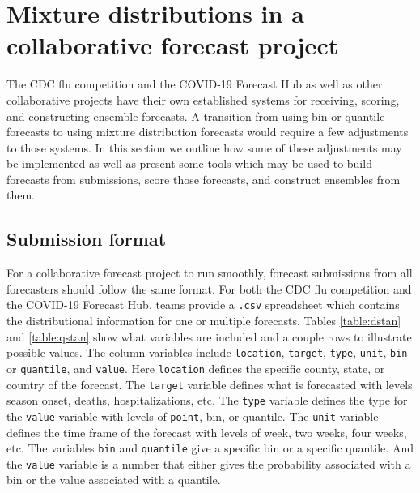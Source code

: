 \documentclass[11pt,notitlepage]{isuthesis}
\begin{document}
\begin{flushleft}
\end{flushleft}



























\chapter{Mixture distributions in a collaborative forecast project}
\label{section:conmixforc}


The CDC flu competition and the COVID-19 Forecast Hub as well as other 
collaborative projects
have their own established systems for receiving, 
scoring, and constructing ensemble forecasts. A transition from using bin or 
quantile forecasts to using mixture distribution forecasts
would require
a few adjustments to those systems. In this section we outline how some of these
adjustments may be implemented as well as present some tools which may be used
to build forecasts from submissions, score those forecasts, and construct 
ensembles from them.

\section{Submission format}
For a collaborative forecast project to run smoothly, forecast submissions from 
all forecasters 
should follow the same format. For both the CDC flu competition and
the COVID-19 Forecast Hub, teams provide a \texttt{.csv} spreadsheet which 
contains the distributional information for one or multiple forecasts. Tables
\ref{table:dstan} and \ref{table:qstan} show what variables are included and a
couple rows to illustrate possible values.
The column variables include \texttt{location}, \texttt{target}, \texttt{type},
\texttt{unit}, \texttt{bin} or \texttt{quantile}, and \texttt{value}.
Here \texttt{location} defines the specific county, state, or country of the 
forecast. The \texttt{target} variable defines what is forecasted with levels
season onset, deaths, hospitalizations, etc. The \texttt{type} variable defines
the type for the \texttt{value} variable with levels of \texttt{point}, 
bin, or quantile.
The \texttt{unit} variable defines the time frame of the forecast with levels of
week,
two weeks, four weeks, etc. The variables \texttt{bin} and \texttt{quantile}
give a specific bin or a specific quantile. And the \texttt{value} variable is a 
number that 
either gives the probability associated with a bin or the value associated 
with a quantile.
\end{document}
